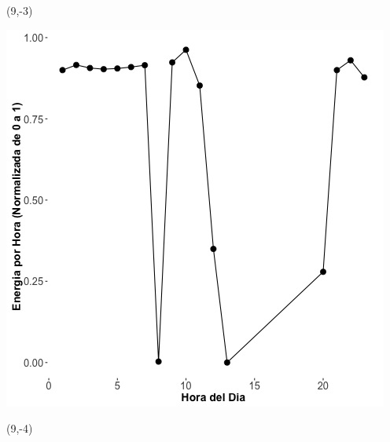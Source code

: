 \documentclass{article}\usepackage[]{graphicx}\usepackage[]{color}
\newenvironment{knitrout}{}{} %
\begin{document}
 \begin{textblock}{1}(9,-3)
\begin{minipage}{20em}
\begingroup

\endgroup
\end{minipage}
\end{textblock}

 \vspace{2cm}

\begin{knitrout}
\color{fgcolor}
\includegraphics[scale=0.75]{figure/A17_fplot_norm_median} 
\end{knitrout}


 \begin{textblock}{1}(9,-4)
\begin{minipage}{20em}
\begingroup

\endgroup
\end{minipage}
\end{textblock}

 \vspace{2cm}
\end{document}
